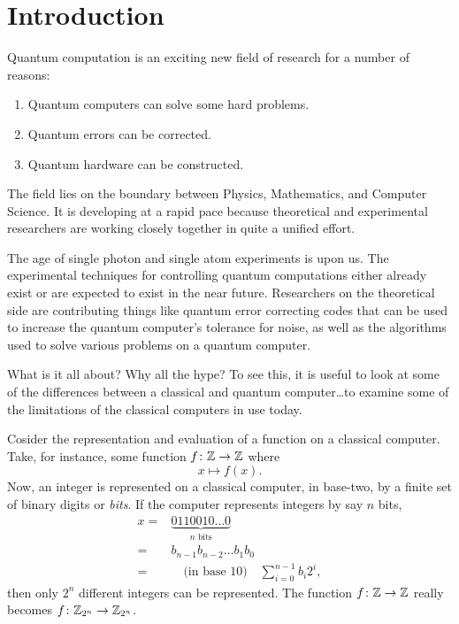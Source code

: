 


\chapter{Introduction}
\label{chap:introduction}
%

Quantum computation is an exciting new field of research for a number 
of reasons\cite{Preskill:98}:  
\begin{enumerate}
\item Quantum computers can solve some hard problems.
\item Quantum errors can be corrected.
\item Quantum hardware can be constructed.
\end{enumerate}
The field lies on the boundary between Physics, Mathematics, 
and Computer Science.  It is developing at a rapid pace because
theoretical and experimental researchers are working closely together
in quite a unified effort.

The age of single photon and single atom experiments is upon us. 
The experimental techniques for controlling quantum computations 
either already exist or are expected to exist in the near future.
Researchers on the theoretical side are contributing
things like quantum error correcting codes that can be used to 
increase the quantum computer's tolerance for noise, as well as the
algorithms used to solve various problems on a quantum computer.

What is it all about?  Why all the hype?
To see this, it is useful to look at some of the differences 
between a classical and quantum computer\dots to examine
some of the limitations of the classical computers in use
today.

Cosider the representation and evaluation of a function on a classical
computer.  Take, for instance, some function $f\colon{\mathbb{Z}}\to{\mathbb{Z}}$ where
\begin{equation}
x\mapsto f(x).
\label{e:funcs}
\end{equation}
Now, an integer is represented on a classical computer, in base-two, by a 
finite set of binary digits or \emph{bits}.
If the computer represents
integers by say $n$ bits,
\begin{equation}
\begin{split}
x =& \underset{n\text{ bits}}{\underbrace{0110010\ldots 0}}\\
=& b_{n-1}b_{n-2}\ldots b_1b_0\\
=&\quad\text{(in base 10)}\quad\sum_{i=0}^{n-1} b_i2^i,
\end{split}
\end{equation}
then only $2^n$ different integers can be represented.
The function $f\colon{\mathbb{Z}}\to{\mathbb{Z}}$ really becomes $f\colon{\mathbb{Z}}_{2^n}\to{\mathbb{Z}}_{2^n}$.

